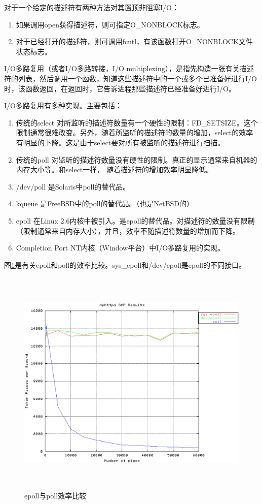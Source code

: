 \documentclass[twoside, xetex]{report}
\begin{document}
	对于一个给定的描述符有两种方法对其置顶非阻塞I/O：
	\begin{enumerate}
		\item 如果调用open获得描述符，则可指定O\_NONBLOCK标志。
		\item 对于已经打开的描述符，则可调用fcntl，有该函数打开O\_NONBLOCK文件状态标志。
	\end{enumerate}
	
	I/O多路复用（或者I/O多路转接，I/O multiplexing），是指先构造一张有关描述符的列表，然后调用一个函数，知道这些描述符中的一个或多个已准备好进行I/O时，该函数返回，在返回时，它告诉进程那些描述符已经准备好进行I/O。
	
	I/O多路复用有多种实现。主要包括：
	\begin{enumerate}
		\item 传统的select 对所监听的描述符数量有一个硬性的限制：FD\_SETSIZE。这个限制通常很难改变。另外，随着所监听的描述符的数量的增加，select的效率有明显的下降。这是由于select要对所有被监听的描述符进行扫描。
		\item 传统的poll 对监听的描述符数量没有硬性的限制。真正的显示通常来自机器的内存大小等。和select一样， 随着描述符的增加效率明显降低。
		\item /dev/poll 是Solaris中poll的替代品。
		\item kqueue 是FreeBSD中的poll的替代品。（也是NetBSD的）
		\item epoll 在Linux 2.6内核中被引入。是epoll的替代品。对描述符的数量没有限制（限制通常来自内存大小），并且，效率不随描述符数量的增加而下降。
		\item Completion Port NT内核（Window平台）中I/O多路复用的实现。
	\end{enumerate}
	
	图\ref{epollvspoll}是有关epoll和poll的效率比较。sys\_epoll和/dev/epoll是epoll的不同接口。
	\begin{figure}[htbp]
	\centering
	\includegraphics[height=11cm, width=15cm]{pics/epollvspoll.eps}
	\caption{epoll与poll效率比较}
	\label{epollvspoll}
	\end{figure}
	
\end{document}
